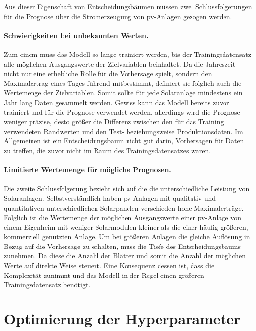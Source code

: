 \documentclass[12pt, a4paper]{article}
\begin{document}
Aus dieser Eigenschaft von Entscheidungsbäumen müssen zwei Schlussfolgerungen für die Prognose über die Stromerzeugung von \ac{pv}-Anlagen gezogen werden. 

\paragraph{Schwierigkeiten bei unbekannten Werten.} 

Zum einem muss das Modell so lange trainiert werden, bis der Trainingsdatensatz alle möglichen Ausgangswerte der Zielvariablen beinhaltet. Da die Jahreszeit nicht nur eine erhebliche Rolle für die Vorhersage spielt, sondern den Maximalertrag eines Tages führend mitbestimmt, definiert sie folglich auch die Wertemenge der Zielvariablen. Somit sollte für jede Solaranlage mindestens ein Jahr lang Daten gesammelt werden. Gewiss kann das Modell bereits zuvor trainiert und für die Prognose verwendet werden, allerdings wird die Prognose weniger präzise, desto größer die Differenz zwischen den für das Training verwendeten Randwerten und den Test- beziehungsweise Produktionsdaten. Im Allgemeinen ist ein Entscheidungsbaum nicht gut darin, Vorhersagen für Daten zu treffen, die zuvor nicht im Raum des Trainingsdatensatzes waren.

\paragraph{Limitierte Wertemenge für mögliche Prognosen.}

Die zweite Schlussfolgerung bezieht sich auf die die unterschiedliche Leistung von Solaranlagen. Selbstverständlich haben \ac{pv}-Anlagen mit qualitativ und quantitativen unterschiedlichen Solarpanelen verschieden hohe Maximalerträge. Folglich ist die Wertemenge der möglichen Ausgangswerte einer \ac{pv}-Anlage von einem Eigenheim mit weniger Solarmodulen kleiner als die einer häufig größeren, kommerziell genutzten Anlage. Um bei größeren Anlagen die gleiche Auflösung in Bezug auf die Vorhersage zu erhalten, muss die Tiefe des Entscheidungsbaums zunehmen. Da diese die Anzahl der Blätter und somit die Anzahl der möglichen Werte auf direkte Weise steuert. Eine Konsequenz dessen ist, dass die Komplexität zunimmt und das Modell in der Regel einen größeren Trainingsdatensatz benötigt.

\newpage

\section{Optimierung der Hyperparameter}
\label{sec:hyperparameters}
\end{document}
